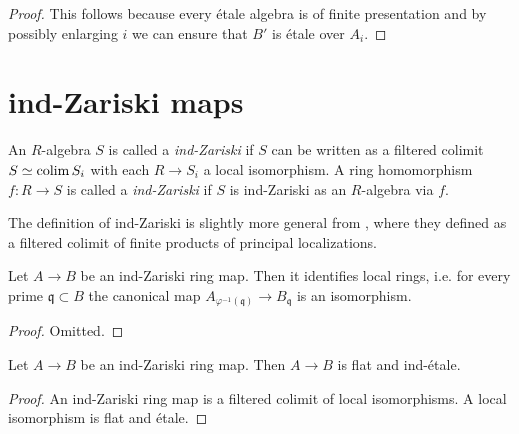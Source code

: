 \begin{proof}
    This follows because every étale algebra is of finite presentation and by possibly enlarging $i$ we can ensure
    that $B'$ is étale over $A_i$.
\end{proof}

\section{ind-Zariski maps}

\begin{definition}
    \label{def:ind-Zariski}
    An $R$-algebra $S$ is called a \emph{ind-Zariski} if $S$ can be written as a filtered colimit $S \simeq \operatorname{colim} S_i$ with each $R \to S_i$ a local isomorphism. A ring homomorphism $f : R \to S$ is called a \emph{ind-Zariski} if $S$ is ind-Zariski as an $R$-algebra via $f$.
\end{definition}

\begin{remark}
  The definition of ind-Zariski is slightly more general from \cite[Definition 2.2.1(iv)]{proetale}, where they defined as a filtered colimit of finite products of principal localizations.
\end{remark}

\begin{lemma}
  Let $A \to B$ be an ind-Zariski ring map. Then it identifies local rings, i.e. for every prime $\mathfrak{q} \subset B$ the canonical map $A_{\varphi^{-1}(\mathfrak{q})} \to B_{\mathfrak{q}}$ is an isomorphism.
  \label{thm:ind-Zariski-identifies-local-rings}
\end{lemma}

\begin{proof}
  Omitted.
\end{proof}

\begin{lemma}
  Let $A \to B$ be an ind-Zariski ring map. Then $A \to B$ is flat and ind-étale.
  \label{thm:ind-Zariski-is-flat-ind-etale}
\end{lemma}

\begin{proof}
  An ind-Zariski ring map is a filtered colimit of local isomorphisms. A local isomorphism is flat and étale.
\end{proof}

